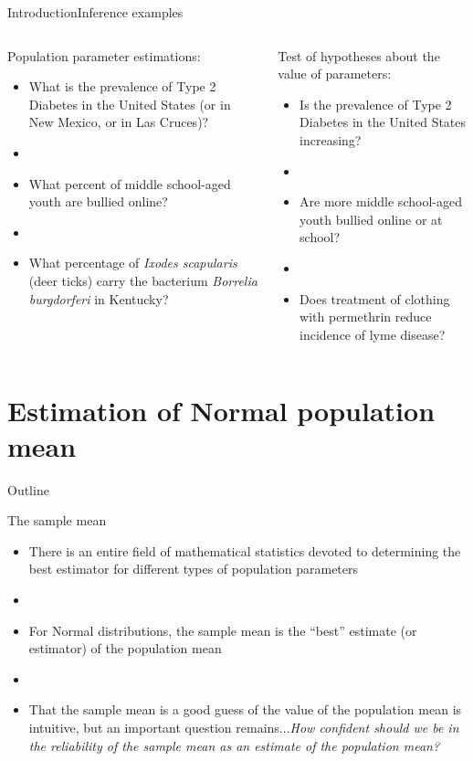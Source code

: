 \documentclass[xcolor=dvipsnames]{beamer}
\begin{document}
\begin{frame}{Introduction}{Inference examples}
	\begin{columns}
		\begin{column}{.5 \textwidth}
			Population parameter estimations:
			\begin{itemize}
				\item What is the prevalence of Type 2 Diabetes in the United States (or in New Mexico, or in Las Cruces)?
				\item[]
				\item What percent of middle school-aged youth are bullied online?
				\item[]
				\item What percentage of \emph{Ixodes scapularis} (deer ticks) carry the bacterium \emph{Borrelia burgdorferi} in Kentucky?
			\end{itemize}
		\end{column}
	
		\begin{column}{.5 \textwidth}
			Test of hypotheses about the value of parameters:
			\begin{itemize}
				\item Is the prevalence of Type 2 Diabetes in the United States increasing? 
				\item[]
				\item Are more middle school-aged youth bullied online or at school?
				\item[]
				\item Does treatment of clothing with permethrin reduce incidence of lyme disease?
			\end{itemize}
		\end{column}
	\end{columns}
\end{frame}

\section{Estimation of Normal population mean}
\begin{frame}{Outline}
	\tableofcontents[currentsection,subsectionstyle=show/shaded/hide]
\end{frame}

\begin{frame}{The sample mean}
	\begin{itemize}
		\item There is an entire field of mathematical statistics devoted to determining the best estimator for different types of population parameters
		\item[]
		\item For Normal distributions, the sample mean is the ``best'' estimate (or estimator) of the population mean 
		\item[]
		\item That the sample mean is a good guess of the value of the population mean is intuitive, but an important question remains...\emph{How confident should we be in the reliability of the sample mean as an estimate of the population mean?}
	\end{itemize}
\end{frame}
\end{document}

